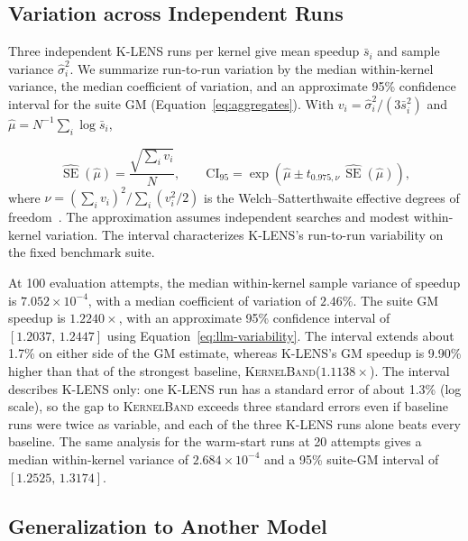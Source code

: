 \documentclass[acmsmall,screen,review,anonymous,nonacm]{acmart}
\newcommand{\klens}{\textsc{K-LENS}\xspace}
\newcommand{\kernelband}{\textsc{KernelBand}\xspace}
\newcommand{\numprofiles}{100\xspace}
\begin{document}
\subsection{Variation across Independent Runs}
\label{sec:variability}

Three independent \klens runs per kernel give mean speedup $\bar s_i$ and sample variance
$\hat\sigma_i^2$. We summarize run-to-run variation by the median within-kernel variance,
the median coefficient of variation, and an approximate 95\% confidence interval for the suite GM
(Equation~\ref{eq:aggregates}). With
$v_i=\hat\sigma_i^2/(3\bar s_i^2)$ and $\hat\mu=N^{-1}\sum_i\log\bar s_i$,

\begin{equation}
 \widehat{\operatorname{SE}}(\hat\mu)=\frac{\sqrt{\sum_i v_i}}{N},\qquad
 \mathrm{CI}_{95}=\exp\!\left(\hat\mu\pm t_{0.975,\nu}\,
          \widehat{\operatorname{SE}}(\hat\mu)\right),
 \label{eq:llm-variability}
\end{equation}
where $\nu=(\sum_i v_i)^2/\sum_i(v_i^2/2)$ is the Welch--Satterthwaite effective degrees of
freedom~\citep{NIST1994Uncertainty}. The approximation assumes independent searches and modest
within-kernel variation. The interval characterizes \klens's run-to-run variability
on the fixed benchmark suite.

At \numprofiles evaluation attempts, the median within-kernel sample variance of speedup is
$7.052\times10^{-4}$, with a median coefficient of variation of $2.46\%$.
The suite GM speedup is $1.2240\times$, with an approximate 95\% confidence interval of
$[1.2037,\,1.2447]$ using Equation~\ref{eq:llm-variability}.
The interval extends about 1.7\% on either side of the GM estimate, whereas \klens's GM speedup
is 9.90\% higher than that of the strongest baseline, \kernelband ($1.1138\times$).
The interval describes \klens only: one \klens run has a standard error of about 1.3\% (log scale),
so the gap to \kernelband exceeds three standard errors even if baseline runs were twice as variable,
and each of the three \klens runs alone beats every baseline.
The same analysis for the warm-start runs at 20 attempts gives a median
within-kernel variance of $2.684\times10^{-4}$ and a 95\% suite-GM interval of $[1.2525,\,1.3174]$.

\subsection{Generalization to Another Model}
\label{sec:model-generalization}
\end{document}
